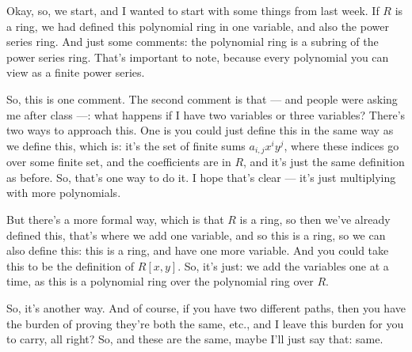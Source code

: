 \begin{speech}[00:00:00 - 00:01:55]
Okay, so, we start, and I wanted to start with some things from last week.  If $R$ is a ring, we had defined this polynomial ring in one variable, and also the power series ring.  And just some comments: the polynomial ring is a subring of the power series ring.  That's important to note, because every polynomial you can view as a finite power series. 

So, this is one comment. The second comment is that --- and people were asking me after class ---: what happens if I have two variables or three variables?  There's two ways to approach this. One is you could just define this in the same way as we define this,  which is: it's the set of finite sums $a_{i,j} x^i y^j$, where these indices go over some finite set, and the coefficients are in $R$,  and it's just the same definition as before. So, that's one way to do it. I hope that's clear --- it's just multiplying with more polynomials. 

But there's a more formal way, which is that $R$ is a ring, so then we've already defined this, that's where we add one variable,  and so this is a ring, so we can also define this: this is a ring, and have one more variable.  And you could take this to be the definition of $R[x, y]$.  So, it's just: we add the variables one at a time, as this is a polynomial ring over the polynomial ring over $R$. 

So, it's another way. And of course, if you have two different paths, then you have the burden of proving they're both the same, etc., and I leave this burden for you to carry, all right? So, and these are the same, maybe I'll just say that:  same.
\end{speech}

